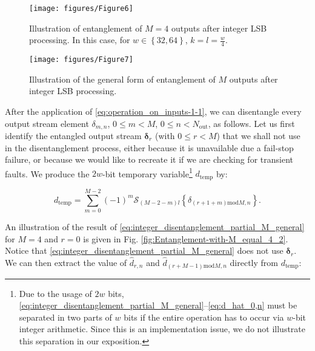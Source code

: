 \documentclass[twocolumn,english,onecolumn]{IEEEtran}
\theoremstyle{plain}
\theoremstyle{plain}
\begin{document}
\begin{figure}[tp]
\begin{centering}
\texttt{[image: figures/Figure6]}
\par\end{centering}

\protect\caption{Illustration of entanglement of $M=4$ outputs after integer LSB processing.
In this case, for $w\in\left\{ 32,64\right\} $, $k=l=\frac{w}{4}$.
\label{fig:Entanglement-with-M_equal_4} }
\end{figure}


\begin{figure}[tbh]
\begin{centering}
\texttt{[image: figures/Figure7]}
\par\end{centering}

\protect\caption{Illustration of the general form of entanglement of $M$ outputs after
integer LSB processing. \label{fig:M_part1}}
\end{figure}


After the application of \eqref{eq:operation_on_inputs-1-1}, we can
disentangle every output stream element $\delta_{m,n}$, $0\leq m<M$,
$0\leq n<N_{\text{out}}$, as follows. Let us first identify the entangled
output stream $\boldsymbol{\delta}_{r}$ (with $0\leq r<M$) that
we shall not use in the disentanglement process, either because it
is unavailable due a fail-stop failure, or because we would like to
recreate it if we are checking for transient faults. We produce the
$2w$-bit temporary variable\footnote{Due to the usage of $2w$ bits, \eqref{eq:integer_disentanglement_partial_M_general}--\eqref{eq:d_hat_0,n}
must be separated in two parts of $w$ bits if the entire operation
has to occur via $w$-bit integer arithmetic. Since this is an implementation
issue, we do not illustrate this separation in our exposition. } $d_{\textrm{temp}}$ by:

\begin{equation}
d_{\textrm{temp}}=\sum_{m=0}^{M-2}\left(-1\right)^{m}\mathcal{S}_{(M-2-m)l}\left\{ \delta_{\left(r+1+m\right)\text{mod}M,n}\right\} .\label{eq:integer_disentanglement_partial_M_general}
\end{equation}


An illustration of the result of \eqref{eq:integer_disentanglement_partial_M_general}
for $M=4$ and $r=0$ is given in Fig. \ref{fig:Entanglement-with-M_equal_4_2}.
Notice that \eqref{eq:integer_disentanglement_partial_M_general}
does not use $\boldsymbol{\delta}_{r}$. We can then extract the value
of $\hat{d}_{r,n}$ and $\hat{d}_{\left(r+M-1\right)\text{mod}M,n}$
directly from $d_{\textrm{temp}}$:
\end{document}
